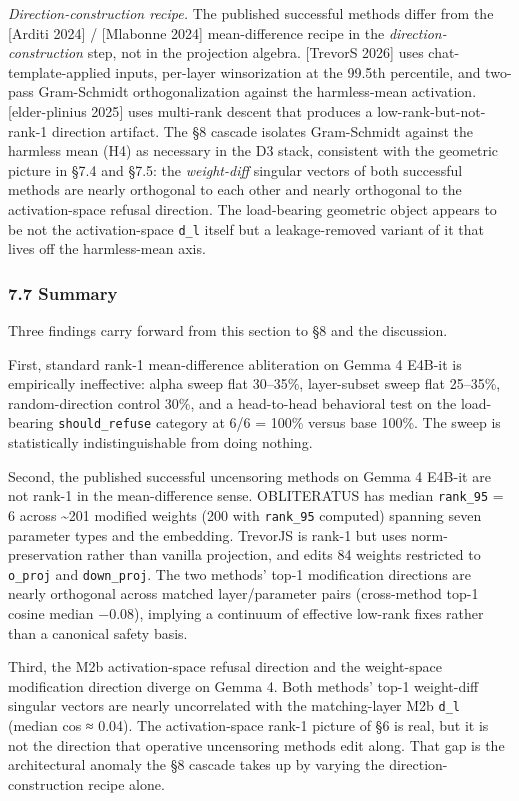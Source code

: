 \documentclass[
  11pt,
]{article}
\begin{document}
\emph{Direction-construction recipe.} The published successful methods
differ from the {[}Arditi 2024{]} / {[}Mlabonne 2024{]} mean-difference
recipe in the \emph{direction-construction} step, not in the projection
algebra. {[}TrevorS 2026{]} uses chat-template-applied inputs, per-layer
winsorization at the 99.5th percentile, and two-pass Gram-Schmidt
orthogonalization against the harmless-mean activation. {[}elder-plinius
2025{]} uses multi-rank descent that produces a low-rank-but-not-rank-1
direction artifact. The §8 cascade isolates Gram-Schmidt against the
harmless mean (H4) as necessary in the D3 stack, consistent with the
geometric picture in §7.4 and §7.5: the \emph{weight-diff} singular
vectors of both successful methods are nearly orthogonal to each other
and nearly orthogonal to the activation-space refusal direction. The
load-bearing geometric object appears to be not the activation-space
\texttt{d\_l} itself but a leakage-removed variant of it that lives off
the harmless-mean axis.

\subsubsection{7.7 Summary}\label{summary-1}

Three findings carry forward from this section to §8 and the discussion.

First, standard rank-1 mean-difference abliteration on Gemma 4 E4B-it is
empirically ineffective: alpha sweep flat 30--35\%, layer-subset sweep
flat 25--35\%, random-direction control 30\%, and a head-to-head
behavioral test on the load-bearing \texttt{should\_refuse} category at
6/6 = 100\% versus base 100\%. The sweep is statistically
indistinguishable from doing nothing.

Second, the published successful uncensoring methods on Gemma 4 E4B-it
are not rank-1 in the mean-difference sense. OBLITERATUS has median
\texttt{rank\_95} = 6 across \textasciitilde201 modified weights (200
with \texttt{rank\_95} computed) spanning seven parameter types and the
embedding. TrevorJS is rank-1 but uses norm-preservation rather than
vanilla projection, and edits 84 weights restricted to \texttt{o\_proj}
and \texttt{down\_proj}. The two methods' top-1 modification directions
are nearly orthogonal across matched layer/parameter pairs (cross-method
top-1 cosine median −0.08), implying a continuum of effective low-rank
fixes rather than a canonical safety basis.

Third, the M2b activation-space refusal direction and the weight-space
modification direction diverge on Gemma 4. Both methods' top-1
weight-diff singular vectors are nearly uncorrelated with the
matching-layer M2b \texttt{d\_l} (median \textbar cos\textbar{} ≈ 0.04).
The activation-space rank-1 picture of §6 is real, but it is not the
direction that operative uncensoring methods edit along. That gap is the
architectural anomaly the §8 cascade takes up by varying the
direction-construction recipe alone.
\end{document}
